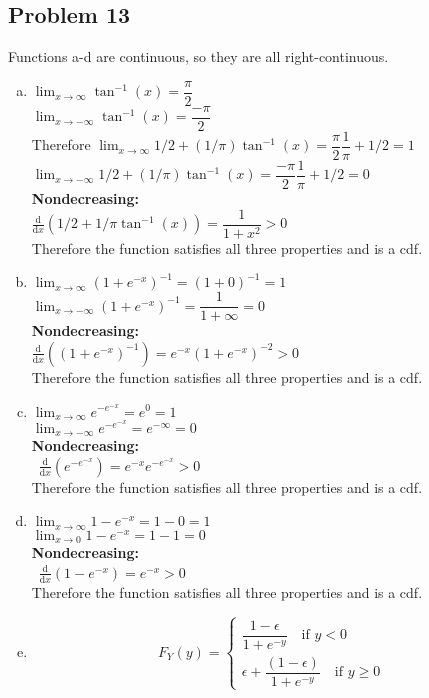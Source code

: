\documentclass{article}
\newcommand{\deriv}[1]{\frac{\mathrm{d}}{\mathrm{d}x} (#1)}
\begin{document}
\begin{flushleft}
\section*{Problem 13} Functions a-d are continuous, so they are all right-continuous.
\begin{enumerate}[(a)]
\item
$\lim_{x\to \infty} \tan^{-1}(x)=\dfrac{\pi}{2}$\\
$\lim_{x\to -\infty} \tan^{-1}(x)=\dfrac{-\pi}{2}$\\
Therefore $\lim_{x\to \infty}1/2 +(1/\pi)\tan^{-1}(x)=\dfrac{\pi}{2}\dfrac{1}{\pi}+1/2=1$\\
$\lim_{x\to -\infty}1/2 +(1/\pi)\tan^{-1}(x)=\dfrac{-\pi}{2}\dfrac{1}{\pi}+1/2=0$\\
\textbf{Nondecreasing:}\\
$\deriv{1/2+1/\pi \tan^{-1}(x)}=\dfrac{1}{1+x^2}>0$\\
Therefore the function satisfies all three properties and is a cdf.
\item
$\lim_{x\to \infty}(1+e^{-x})^{-1}=(1+0)^{-1}=1$\\
$\lim_{x\to -\infty}(1+e^{-x})^{-1}=\dfrac{1}{1+\infty}=0$\\
\textbf{Nondecreasing:}\\
$\deriv{(1+e^{-x})^{-1}}=e^{-x}(1+e^{-x})^{-2}>0$\\
Therefore the function satisfies all three properties and is a cdf.
\item
$\lim_{x\to \infty} e^{-e^{-x}}=e^0=1$\\
$\lim_{x\to -\infty} e^{-e^{-x}}=e^{-\infty}=0$\\
\textbf{Nondecreasing:}\\\
$\deriv{e^{-e^{-x}}}=e^{-x}e^{-e^{-x}}>0$\\
Therefore the function satisfies all three properties and is a cdf.
\item
$\lim_{x\to \infty}1-e^{-x}=1-0=1$\\
$\lim_{x\to 0}1-e^{-x}=1-1=0$\\
\textbf{Nondecreasing:}\\\
$\deriv{1-e^{-x}}=e^{-x}>0$\\
Therefore the function satisfies all three properties and is a cdf.
\item
\[F_Y(y)=\begin{cases}
\dfrac{1-\epsilon}{1+e^{-y}} \quad \text{if } y<0\\
\epsilon + \dfrac{(1-\epsilon)}{1+e^{-y}} \quad \text{if } y \geq 0
\end{cases}
\]
\end{enumerate}
\end{flushleft}
\end{document}
